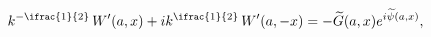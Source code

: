 \[k^{-\ifrac{1}{2}}\mathop{W\/}\nolimits'\!\left(a,x\right)+ik^{\ifrac{1}{2}}%
\mathop{W\/}\nolimits'\!\left(a,-x\right)=-\widetilde{G}(a,x)e^{i\widetilde{%
\psi}(a,x)},\]